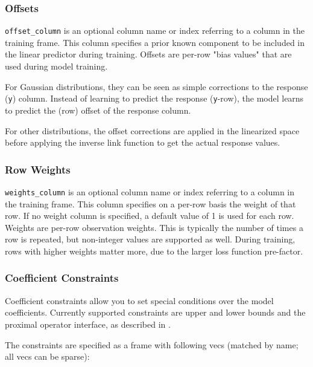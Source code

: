 \subsubsection{Offsets}

\texttt{offset\_column} is an optional column name or index referring to a column in the training frame. This column specifies a prior known component to be included in the linear predictor during training. Offsets are per-row "bias values" that are used during model training. 

For Gaussian distributions, they can be seen as simple corrections to the response (\texttt{y}) column. Instead of learning to predict the response (\texttt{y}-row), the model learns to predict the (row) offset of the response column. 

For other distributions, the offset corrections are applied in the linearized space before applying the inverse link function to get the actual response values.  

\subsubsection{Row Weights}
\texttt{weights\_column} is an optional column name or index referring to a column in the training frame. This column specifies on a per-row basis the weight of that row.  If no weight column is specified, a default value of 1 is used for each row. Weights are per-row observation weights. This is typically the number of times a row is repeated, but non-integer values are supported as well. During training, rows with higher weights matter more, due to the larger loss function pre-factor.

\subsubsection{Coefficient Constraints}
Coefficient constraints allow you to set special conditions over the model coefficients. Currently supported
constraints are upper and lower bounds and the proximal operator interface, as described in .

The constraints are specified as a frame with following vecs (matched by name; all vecs can be sparse):

